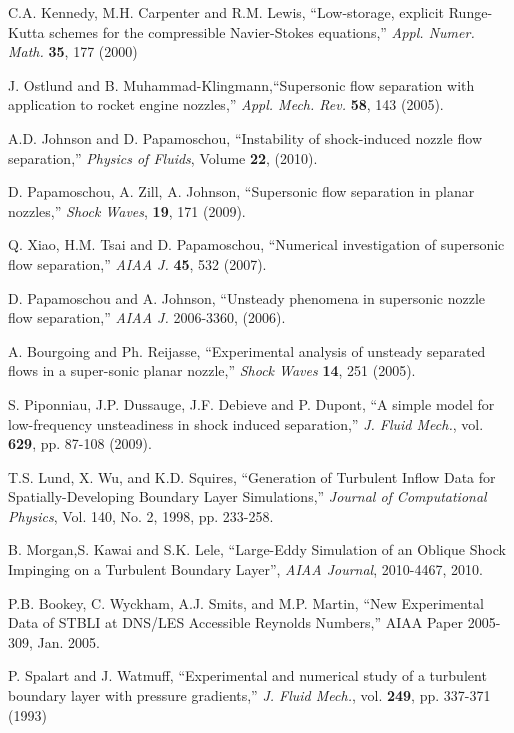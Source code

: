 \documentclass[]{aiaa-tc}%
\begin{document}
\begin{thebibliography}{10}
 	C.A. Kennedy, M.H. Carpenter and R.M. Lewis, ``Low-storage, explicit Runge-Kutta schemes for the compressible Navier-Stokes equations,'' \emph{Appl. Numer. Math.} {\bf 35}, 177 (2000) 
 
 	J. Ostlund and B. Muhammad-Klingmann,``Supersonic flow separation with application to rocket engine nozzles,'' \emph{Appl. Mech. Rev.} {\bf 58}, 143 (2005).
 
 	A.D. Johnson and D. Papamoschou, ``Instability of shock-induced nozzle flow separation,'' \emph{Physics of Fluids}, Volume {\bf 22}, (2010).
	
 	D. Papamoschou, A. Zill, A. Johnson, ``Supersonic flow separation in planar nozzles,'' \emph{Shock Waves}, {\bf 19}, 171 (2009).

 	Q. Xiao, H.M. Tsai and D. Papamoschou, ``Numerical investigation of supersonic flow separation,'' \emph{AIAA J.} {\bf 45}, 532 (2007).
	
 	D. Papamoschou and A. Johnson, ``Unsteady phenomena in supersonic nozzle flow separation,'' \emph{AIAA J.} 2006-3360, (2006).
	
 	A. Bourgoing and Ph. Reijasse, ``Experimental analysis of unsteady separated flows in a super-sonic planar nozzle,'' \emph{Shock Waves} {\bf 14}, 251 (2005).
	
 	S. Piponniau, J.P. Dussauge, J.F. Debieve and P. Dupont, ``A simple model for low-frequency unsteadiness in shock induced separation,'' \emph{J. Fluid Mech.}, vol. {\bf 629}, pp. 87-108 (2009).
	
 	T.S. Lund, X. Wu, and K.D. Squires, ``Generation of Turbulent Inflow Data for Spatially-Developing Boundary Layer 
Simulations,'' \emph{Journal of Computational Physics}, Vol. 140, No. 2, 1998, pp. 233-258.


 	B. Morgan,S. Kawai and S.K. Lele, ``Large-Eddy Simulation of an Oblique Shock Impinging on a 
Turbulent Boundary Layer'', \emph{AIAA Journal}, 2010-4467, 2010.
 	
 	P.B. Bookey, C. Wyckham, A.J. Smits, and M.P. Martin, ``New Experimental Data of STBLI at DNS/LES Accessible 
Reynolds Numbers,''  AIAA Paper 2005-309, Jan. 2005.

	P. Spalart and J. Watmuff, ``Experimental and numerical study of a turbulent boundary layer with pressure gradients,'' \emph{J. Fluid Mech.},
vol. {\bf 249}, pp. 337-371 (1993)	

 
	
\end{thebibliography}
\end{document}
